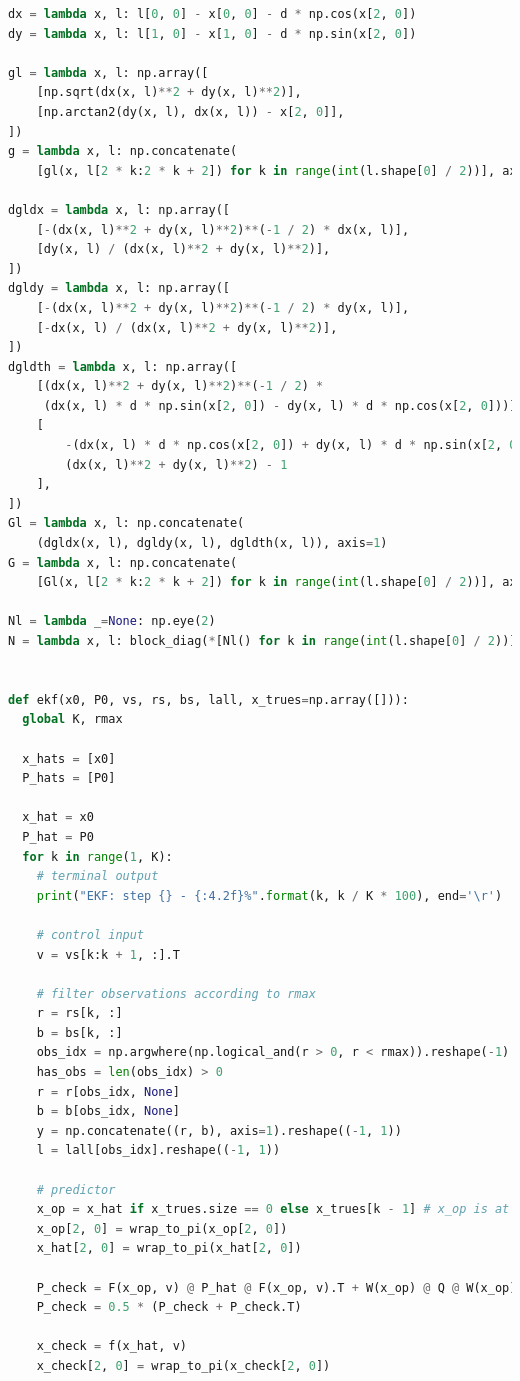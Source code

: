 \documentclass[a4paper]{article}
\begin{document}
\begin{lstlisting}[language=Python, basicstyle=\small]
dx = lambda x, l: l[0, 0] - x[0, 0] - d * np.cos(x[2, 0])
dy = lambda x, l: l[1, 0] - x[1, 0] - d * np.sin(x[2, 0])

gl = lambda x, l: np.array([
    [np.sqrt(dx(x, l)**2 + dy(x, l)**2)],
    [np.arctan2(dy(x, l), dx(x, l)) - x[2, 0]],
])
g = lambda x, l: np.concatenate(
    [gl(x, l[2 * k:2 * k + 2]) for k in range(int(l.shape[0] / 2))], axis=0)

dgldx = lambda x, l: np.array([
    [-(dx(x, l)**2 + dy(x, l)**2)**(-1 / 2) * dx(x, l)],
    [dy(x, l) / (dx(x, l)**2 + dy(x, l)**2)],
])
dgldy = lambda x, l: np.array([
    [-(dx(x, l)**2 + dy(x, l)**2)**(-1 / 2) * dy(x, l)],
    [-dx(x, l) / (dx(x, l)**2 + dy(x, l)**2)],
])
dgldth = lambda x, l: np.array([
    [(dx(x, l)**2 + dy(x, l)**2)**(-1 / 2) *
     (dx(x, l) * d * np.sin(x[2, 0]) - dy(x, l) * d * np.cos(x[2, 0]))],
    [
        -(dx(x, l) * d * np.cos(x[2, 0]) + dy(x, l) * d * np.sin(x[2, 0])) /
        (dx(x, l)**2 + dy(x, l)**2) - 1
    ],
])
Gl = lambda x, l: np.concatenate(
    (dgldx(x, l), dgldy(x, l), dgldth(x, l)), axis=1)
G = lambda x, l: np.concatenate(
    [Gl(x, l[2 * k:2 * k + 2]) for k in range(int(l.shape[0] / 2))], axis=0)

Nl = lambda _=None: np.eye(2)
N = lambda x, l: block_diag(*[Nl() for k in range(int(l.shape[0] / 2))])


def ekf(x0, P0, vs, rs, bs, lall, x_trues=np.array([])):
  global K, rmax

  x_hats = [x0]
  P_hats = [P0]

  x_hat = x0
  P_hat = P0
  for k in range(1, K):
    # terminal output
    print("EKF: step {} - {:4.2f}%".format(k, k / K * 100), end='\r')

    # control input
    v = vs[k:k + 1, :].T

    # filter observations according to rmax
    r = rs[k, :]
    b = bs[k, :]
    obs_idx = np.argwhere(np.logical_and(r > 0, r < rmax)).reshape(-1)
    has_obs = len(obs_idx) > 0
    r = r[obs_idx, None]
    b = b[obs_idx, None]
    y = np.concatenate((r, b), axis=1).reshape((-1, 1))
    l = lall[obs_idx].reshape((-1, 1))

    # predictor
    x_op = x_hat if x_trues.size == 0 else x_trues[k - 1] # x_op is at k-1
    x_op[2, 0] = wrap_to_pi(x_op[2, 0])
    x_hat[2, 0] = wrap_to_pi(x_hat[2, 0])

    P_check = F(x_op, v) @ P_hat @ F(x_op, v).T + W(x_op) @ Q @ W(x_op).T
    P_check = 0.5 * (P_check + P_check.T)

    x_check = f(x_hat, v)
    x_check[2, 0] = wrap_to_pi(x_check[2, 0])


\end{lstlisting}
\end{document}
